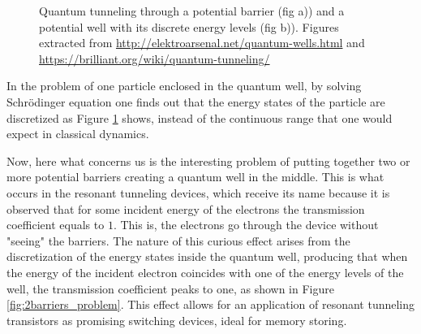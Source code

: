 \documentclass[12pt,a4paper,onecolumn]{article}
\theoremstyle{definition}
\theoremstyle{plain}
\begin{document}
\begin{figure}[h!]
\centering
	\caption{Quantum tunneling through a potential barrier (fig a)) and a potential well with its discrete energy levels (fig b)). Figures extracted from {\url{http://elektroarsenal.net/quantum-wells.html}} and {\url{https://brilliant.org/wiki/quantum-tunneling/}} }
	\label{fig:1Dproblems}
\end{figure}

In the problem of one particle enclosed in the quantum well, by solving Schrödinger equation one finds out that the energy states of the particle are discretized as Figure \ref {fig:1Dproblems} shows, instead of the continuous range that one would expect in classical dynamics. 

Now, here what concerns us is the interesting problem of putting together two or more potential barriers creating a quantum well in the middle. This is what occurs in the resonant tunneling devices, which receive its name because it is observed that for some incident energy of the electrons the transmission coefficient equals to $1$. This is, the electrons go through the device without "seeing" the barriers. The nature of this curious effect arises from the discretization of the energy states inside the quantum well, producing that when the energy of the incident electron coincides with one of the energy levels of the well, the transmission coefficient peaks to one, as shown in Figure \ref {fig:2barriers_problem}. This effect allows for an application of resonant tunneling transistors as promising switching devices, ideal for memory storing. 
\end{document}
